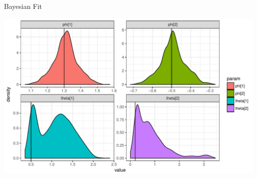 \documentclass[11pt,ignorenonframetext,]{beamer}
\begin{document}
\begin{frame}{Bayesian Fit}

\begin{center}\includegraphics{Lec10_files/figure-beamer/unnamed-chunk-26-1} \end{center}

\end{frame}
\end{document}
